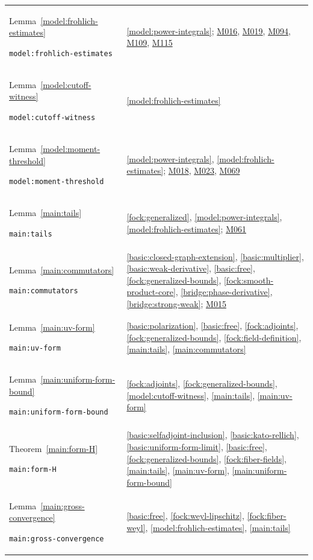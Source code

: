 \documentclass[11pt,a4paper]{article}
\theoremstyle{definition}
\theoremstyle{remark}
\begin{document}
\begin{longtable}{@{}p{}p{}@{}}
Lemma~\ref{model:frohlich-estimates}\par\nolinkurl{model:frohlich-estimates} & \ref{model:power-integrals}; \hyperref[base:M016]{M016}, \hyperref[base:M019]{M019}, \hyperref[base:M094]{M094}, \hyperref[base:M109]{M109}, \hyperref[base:M115]{M115} \\[4pt]
Lemma~\ref{model:cutoff-witness}\par\nolinkurl{model:cutoff-witness} & \ref{model:frohlich-estimates} \\[4pt]
Lemma~\ref{model:moment-threshold}\par\nolinkurl{model:moment-threshold} & \ref{model:power-integrals}, \ref{model:frohlich-estimates}; \hyperref[base:M018]{M018}, \hyperref[base:M023]{M023}, \hyperref[base:M069]{M069} \\[4pt]
Lemma~\ref{main:tails}\par\nolinkurl{main:tails} & \ref{fock:generalized}, \ref{model:power-integrals}, \ref{model:frohlich-estimates}; \hyperref[base:M061]{M061} \\[4pt]
Lemma~\ref{main:commutators}\par\nolinkurl{main:commutators} & \ref{basic:closed-graph-extension}, \ref{basic:multiplier}, \ref{basic:weak-derivative}, \ref{basic:free}, \ref{fock:generalized-bounds}, \ref{fock:smooth-product-core}, \ref{bridge:phase-derivative}, \ref{bridge:strong-weak}; \hyperref[base:M015]{M015} \\[4pt]
Lemma~\ref{main:uv-form}\par\nolinkurl{main:uv-form} & \ref{basic:polarization}, \ref{basic:free}, \ref{fock:adjoints}, \ref{fock:generalized-bounds}, \ref{fock:field-definition}, \ref{main:tails}, \ref{main:commutators} \\[4pt]
Lemma~\ref{main:uniform-form-bound}\par\nolinkurl{main:uniform-form-bound} & \ref{fock:adjoints}, \ref{fock:generalized-bounds}, \ref{model:cutoff-witness}, \ref{main:tails}, \ref{main:uv-form} \\[4pt]
Theorem~\ref{main:form-H}\par\nolinkurl{main:form-H} & \ref{basic:selfadjoint-inclusion}, \ref{basic:kato-rellich}, \ref{basic:uniform-form-limit}, \ref{basic:free}, \ref{fock:generalized-bounds}, \ref{fock:fiber-fields}, \ref{main:tails}, \ref{main:uv-form}, \ref{main:uniform-form-bound} \\[4pt]
Lemma~\ref{main:gross-convergence}\par\nolinkurl{main:gross-convergence} & \ref{basic:free}, \ref{fock:weyl-lipschitz}, \ref{fock:fiber-weyl}, \ref{model:frohlich-estimates}, \ref{main:tails} \\[4pt]

\end{longtable}
\end{document}
